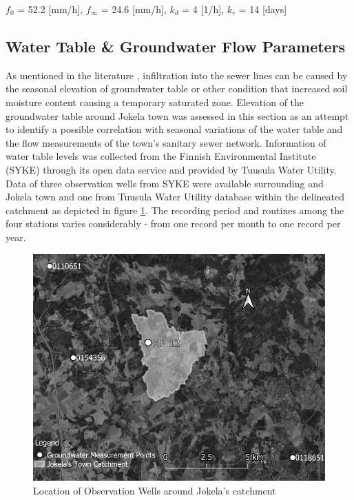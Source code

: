 \begin{center}
  $f_0$ = 52.2 [mm/h], $f_\infty$ = 24.6 [mm/h], $k_d$ = 4 [1/h], $k_r$ = 14 [days]  
\end{center}






\subsection{Water Table \& Groundwater Flow Parameters} \label{gwcs}

As mentioned in the literature \citet{Bennett1999,Vallabhaneni2007,Barden2015}, infiltration into the sewer lines can be caused by the seasonal elevation of groundwater table or other condition that increased soil moisture content causing a temporary saturated zone. Elevation of the groundwater table around Jokela town was assessed in this section as an attempt to identify a possible correlation with seasonal variations of the water table and the flow measurements of the town’s sanitary sewer network. 
Information of water table levels was collected from the Finnish Environmental Institute (SYKE) through its open data service \cite{sykedata} and provided by Tuusula Water Utility. Data of three observation wells from SYKE were available surrounding and Jokela town and one from Tuusula Water Utility database within the delineated catchment as depicted in figure \ref{fig:gwmeasurementpoints}. The recording period and routines among the four stations varies considerably - from one record per month to one record per year.

\begin{figure}[h]
    \centering
	\includegraphics[scale=0.75]{figures/gwmeasurement_points.png}
	\caption{Location of Observation Wells around Jokela's catchment}
	\label{fig:gwmeasurementpoints}
\end{figure}

